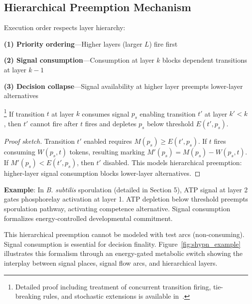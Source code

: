 \subsection{Hierarchical Preemption Mechanism}

Execution order respects layer hierarchy:

\noindent\textbf{(1) Priority ordering}---Higher layers (larger $L$) fire first

\vspace{4pt}
\noindent\textbf{(2) Signal consumption}---Consumption at layer $k$ blocks dependent transitions at layer $k-1$

\vspace{4pt}
\noindent\textbf{(3) Decision collapse}---Signal availability at higher layer preempts lower-layer alternatives

\vspace{4pt}
\begin{theorem}\footnote{Detailed proof including treatment of concurrent transition firing, tie-breaking rules, and stochastic extensions is available in~\cite{subtilis2026}.}
If transition $t$ at layer $k$ consumes signal $p_s$ enabling transition $t'$ at layer $k' < k$, then $t'$ cannot fire after $t$ fires and depletes $p_s$ below threshold $E(t', p_s)$.
\end{theorem}

\begin{proof}[Proof sketch]
Transition $t'$ enabled requires $M(p_s) \geq E(t', p_s)$. If $t$ fires consuming $W(p_s, t)$ tokens, resulting marking $M'(p_s) = M(p_s) - W(p_s, t)$. If $M'(p_s) < E(t', p_s)$, then $t'$ disabled. This models hierarchical preemption: higher-layer signal consumption blocks lower-layer alternatives.
\end{proof}

\vspace{3pt}
\noindent\textbf{Example}: In \textit{B. subtilis} sporulation (detailed in Section 5), ATP signal at layer 2 gates phosphorelay activation at layer 1. ATP depletion below threshold preempts sporulation pathway, activating competence alternative. Signal consumption formalizes energy-controlled developmental commitment.

\vspace{3pt}
\noindent This hierarchical preemption cannot be modeled with test arcs (non-consuming). Signal consumption is essential for decision finality. Figure~\ref{fig:shypn_example} illustrates this formalism through an energy-gated metabolic switch showing the interplay between signal places, signal flow arcs, and hierarchical layers.
